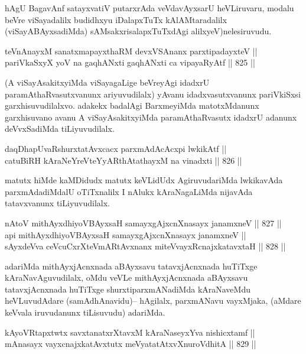 \begin{artha}
hAgU BagavAnf satayxvatiV putarxrAda veVdavAyxsarU heVLiruvaru, modalu beVre viSayadalilx budidhxyu iDalapxTuTx kAlAMtaradalilx (viSayABAyxsadiMda) sAMsakxrisalapxTuTxdAgi alilxyeV)nelesiruvudu.
\end{artha}

\begin{shl}
teVnAnayxM sanatxmapayxthaRM devxVSAnanx parxtipadayxteV || \\
pariVkaSxyX yoV na gaqhANxti gaqhANxti ca vipayaRyAtf \hfill || 825 ||  
\end{shl}

\begin{artha}
(A viSayAsakitxyiMda viSayagaLige beVreyAgi idadxrU paramAthaRvasutxvanunx ariyuvudilalx) yAvanu idadxvasutxvanunx pariVkiSxsi garxhisuvudilalxvo. adakekx badalAgi BarxmeyiMda matotxMdanunx garxhisuvano avanu A viSayAsakitxyiMda paramAthaRvasutx idadxrU adanunx deVvxSadiMda tiLiyuvudilalx.
\end{artha}

\begin{shl}
daqDhapUvaRshurxtatAvxcacx parxmAdAcAcxpi lwkikAtf || \\
catuBiRH kAraNeYreVteYyARthAtathayxM na vinadxti \hfill || 826 ||  
\end{shl}

\begin{artha}
matutx hiMde kaMDidudx matutx keVLidUdx AgiruvudariMda lwkikavAda parxmAdadiMdalU oTiTxnalilx I nAlukx kAraNagaLiMda nijavAda tatavxvanunx tiLiyuvudilalx.
\end{artha}

\begin{shl}
nAtoV mithAyxdhiyoV\s BAyxsaH samayxgAjxcnXnasayx janamxneV \hfill || 827 ||  \\
api mithAyxdhiyoV\s BAyxsaH samayxgAjxcnXnasayx janamxneV || \\
sAyxdeVva ceVcuCxrXteVmARtAvxnanx miteVvayxRcnajxkatavxtaH \hfill || 828 ||  
\end{shl}

\begin{artha}
adariMda mithAyxjAcnxnada aBAyxsavu tatavxjAcnxnada huTiTxge kAraNavAguvudilalx, oMdu veVLe mithAyxjAcnxnada aBAyxsavu tatavxjAcnxnada huTiTxge shurxtiparxmANadiMda kAraNaveMdu heVLuvudAdare (samAdhAnavidu){\rm --} hAgilalx, parxmANavu vayxMjaka, (aMdare keVvala iruvudanunx tiLisuvudu) adariMda.
\end{artha}

\begin{shl}
kAyoVRtapxtwtx savxtanatxrXtavxM kAraNaseyxYva nishicxtamf || \\
mAnasayx vayxcnajxkatAvxtutx meVyatatAtxvXnuroVdhitA \hfill || 829 ||  
\end{shl}

